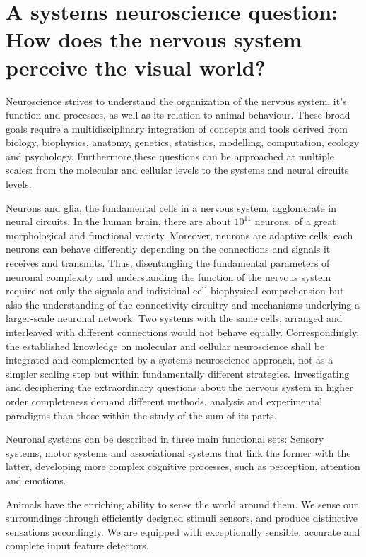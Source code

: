 \section{A systems neuroscience question: How does the nervous system perceive the visual world?}
\label{sec:int_motivation}

Neuroscience strives to understand the organization of the nervous system, it's function and processes, as well as its relation to animal behaviour. These broad goals require a multidisciplinary integration of concepts and tools derived from biology, biophysics, anatomy, genetics, statistics, modelling, computation, ecology and psychology. Furthermore,these questions can be approached at multiple scales: from the molecular and cellular levels to the systems and neural circuits levels.

Neurons and glia, the fundamental cells in a nervous system, agglomerate in neural circuits. In the human brain, there are about $10^11$ neurons, of a great morphological and functional variety. Moreover, neurons are adaptive cells: each neurons can behave differently depending on the connections and signals it receives and transmits. 
Thus, disentangling the fundamental parameters of neuronal complexity and understanding the function of the nervous system require not only the signals and individual cell biophysical comprehension but also the understanding of the connectivity circuitry and mechanisms underlying a larger-scale neuronal network. Two systems with the same cells, arranged and interleaved with different connections would not behave equally. Correspondingly, the established knowledge on molecular and cellular neuroscience shall be integrated and complemented by a systems neuroscience approach, not as a simpler scaling step but within fundamentally different strategies. Investigating and deciphering the extraordinary questions about the nervous system in higher order completeness demand different methods, analysis and experimental paradigms than those within the study of the sum of its parts.

Neuronal systems can be described in three main functional sets: Sensory systems, motor systems and associational systems that link the former with the latter, developing more complex cognitive processes, such as perception, attention and emotions.

Animals have the enriching ability to sense the world around them. We sense our surroundings through efficiently designed stimuli sensors, and produce distinctive sensations accordingly. We are equipped with exceptionally sensible, accurate and complete input feature detectors.

